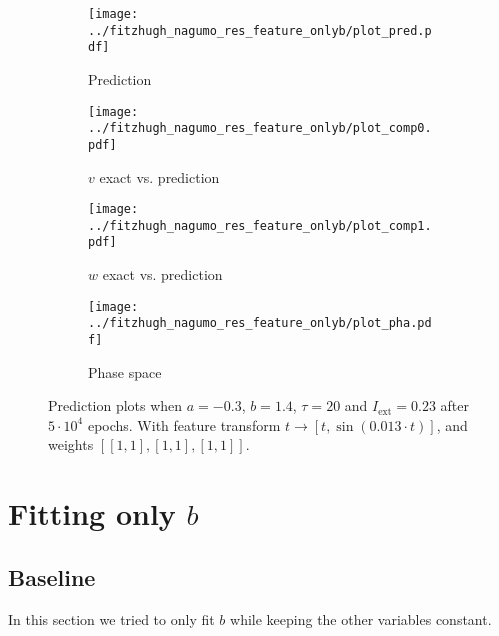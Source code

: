 \documentclass[a4paper]{article}
\begin{document}
\begin{figure}[H]
	\centering 
	\begin{subfigure}[b]{0.47\textwidth}
		\centering
		\texttt{[image: ../fitzhugh\_nagumo\_res\_feature\_onlyb/plot\_pred.pdf]}
		\caption{Prediction}
		\label{fig:ab1a}
	\end{subfigure}
	\begin{subfigure}[b]{0.47\textwidth}
		\centering
		\texttt{[image: ../fitzhugh\_nagumo\_res\_feature\_onlyb/plot\_comp0.pdf]}
		\caption{$v$ exact vs. prediction}
		\label{fig:ab1b}
	\end{subfigure}
	\begin{subfigure}[b]{0.47\textwidth}
		\centering
		\texttt{[image: ../fitzhugh\_nagumo\_res\_feature\_onlyb/plot\_comp1.pdf]}
		\caption{$w$ exact vs. prediction}
		\label{fig:ab1c}
	\end{subfigure}
	\begin{subfigure}[b]{0.47\textwidth}
		\centering
		\texttt{[image: ../fitzhugh\_nagumo\_res\_feature\_onlyb/plot\_pha.pdf]}
		\caption{Phase space}
		\label{fig:ab1d}
	\end{subfigure}
	\caption{Prediction plots when $a=-0.3$, $b=1.4$, $\tau=20$ and $ I_{\text{ext}}=0.23$ after $5\cdot10^4$ epochs. With feature transform $t \rightarrow \left[ t, \sin(0.013\cdot t) \right] $, and weights $\left[ \left[ 1, 1\right], \left[ 1, 1\right], \left[ 1, 1\right]\right]$.}
	\label{plot:ab1}
\end{figure} 	


\section{Fitting only $b$}

\subsection{Baseline}

In this section we tried to only fit $b$ while keeping the other variables constant. 
\end{document}
